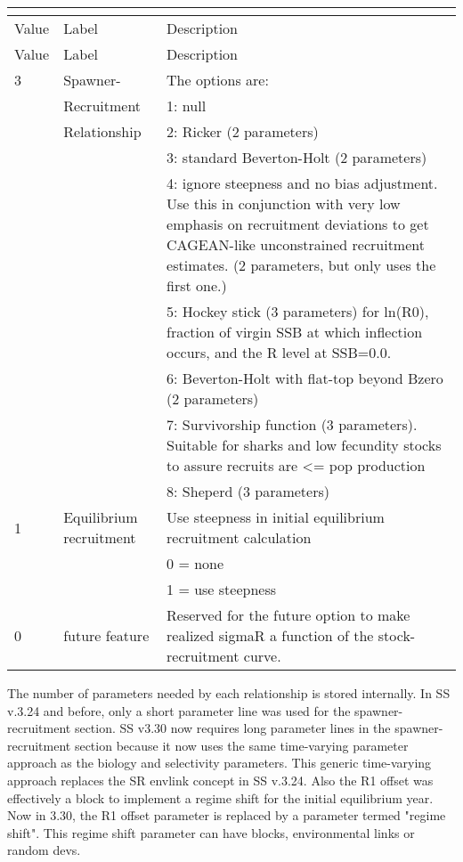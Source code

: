 \begin{center}
	\begin{longtable}{p{1cm} p{3cm} p{11cm}}
		\multicolumn{3}{l}{ }\\
		\hline
		Value & Label &  Description\\
		\hline
		\endfirsthead

		\hline
		Value & Label &  Description\\
		\hline
		\endhead

		\endfoot
		\endlastfoot

		3 & Spawner-            & The options are: \\
		  & Recruitment         & 1: null \\
		  & Relationship        & 2:  Ricker (2 parameters) \\
		  &                     & 3:  standard Beverton-Holt (2 parameters) \\
		  &                     & 4:  ignore steepness and no bias adjustment.  Use this in conjunction with very low emphasis on recruitment deviations to get CAGEAN-like unconstrained recruitment estimates. (2 parameters, but only uses the first one.)\\
		  &                     & 5:  Hockey stick (3 parameters) for ln(R0), fraction of virgin SSB at which inflection occurs, and the R level at SSB=0.0.\\
		  &                     & 6:  Beverton-Holt with flat-top beyond Bzero (2 parameters)\\
		  &                     & 7:  Survivorship function (3 parameters).  Suitable for sharks and low fecundity stocks to assure recruits are <= pop production \\
	      &                     & 8:  Sheperd (3 parameters)\\
	    \hline
	    1 & Equilibrium recruitment & Use steepness in initial equilibrium recruitment calculation \\
	      & 						& 0 = none \\
	      &							& 1 = use steepness \\
	    0 &  future feature         & Reserved for the future option to make realized sigmaR a function of the stock-recruitment curve.  \\ 
	    \hline
	\end{longtable}
\end{center}
The number of parameters needed by each relationship is stored internally.  In SS v.3.24 and before, only a short parameter line was used for the spawner-recruitment section. SS v3.30 now requires long parameter lines in the spawner-recruitment section because it now uses the same time-varying parameter approach as the biology and selectivity parameters.  This generic time-varying approach replaces the SR envlink concept in SS v.3.24.  Also the R1 offset was effectively a block to implement a regime shift for the initial equilibrium year.  Now in 3.30, the R1 offset parameter is replaced by a parameter termed "regime shift".  This regime shift parameter can have blocks, environmental links or random devs. 
